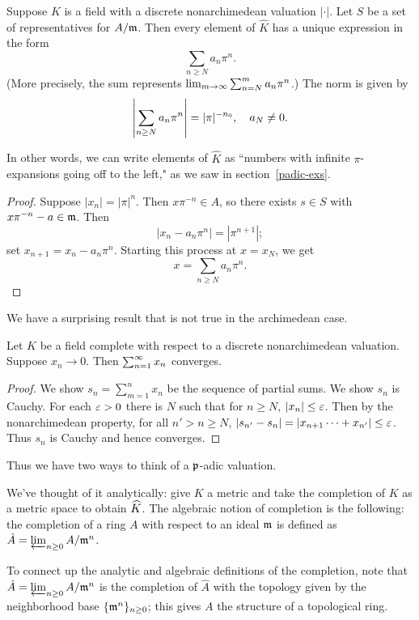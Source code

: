 \begin{pr}
Suppose $K$ is a field with a discrete nonarchimedean valuation $|\cdot|$. 
Let $S$ be a set of representatives for $A/\mathfrak{m}$. Then every element of $\hat K$ has a unique expression in the form
\[
\sum_{n\ge N} a_n \pi^n.
\]
(More precisely, the sum represents $\lim_{m\to \infty}\sum_{n=N}^{m}a_n\pi^n$.) 
The norm is given by
\[
\left| {\sum_{n\ge N} a_n \pi^n} \right|=|\pi|^{-n_0},\quad a_{N}\ne0.
\]
\end{pr}
In other words, we can write elements of $\hat{K}$ as ``numbers with infinite $\pi$-expansions going off to the left," as we saw in section~\ref{padic-exs}.
\begin{proof}
Suppose $|x_n|=|\pi|^n$. Then $x\pi^{-n}\in A$, so there exists $s\in S$ with $x\pi^{-n}-a\in \mathfrak{m}$. Then 
\[
|x_n-a_n\pi^n|=|\pi^{n+1}|;
\]
set $x_{n+1}=x_n-a_n\pi^n$. Starting this process at $x=x_N$, we get 
\[
x=\sum_{n\ge N} a_n\pi^n.
\]
\end{proof}
We have a surprising result that is not true in the archimedean case.
\begin{pr}
Let $K$ be a field complete with respect to a discrete nonarchimedean valuation. 
Suppose $x_n\to 0$. Then $\sum_{n=1}^{\infty} x_n$ converges.
\end{pr}
\begin{proof}
We show $s_n=\sum_{m=1}^n x_n$ be the sequence of partial sums. We show $s_n$ is Cauchy. For each $\varepsilon>0$ there is $N$ such that for $n\ge N$, $|x_n|\le \varepsilon$. Then by the nonarchimedean property, for all $n'>n\ge N$, $|s_{n'}-s_n|=|x_{n+1}\cdots +x_{n'}|\le \varepsilon$. Thus $s_n$ is Cauchy and hence converges.
\end{proof}
Thus we have two ways to think of a $\mathfrak{p}$-adic valuation.

We've thought of it analytically: give $K$ a metric and take the completion of $K$ as a metric space to obtain $\widehat{K}$. 
The algebraic notion of completion is the following: the completion of a ring $A$ with respect to an ideal $\mathfrak{m}$ is defined as $\hat{A}=\varprojlim_{n\ge 0} A/\mathfrak{m}^n$.

To connect up the analytic and algebraic definitions of the completion, note that 
$\hat{A}=\varprojlim_{n\ge 0} A/\mathfrak{m}^n$ is the completion of $\hat{A}$ with the topology given by the neighborhood base $\{\mathfrak{m}^n\}_{n\ge 0}$; this gives $A$ the structure of a topological ring.

